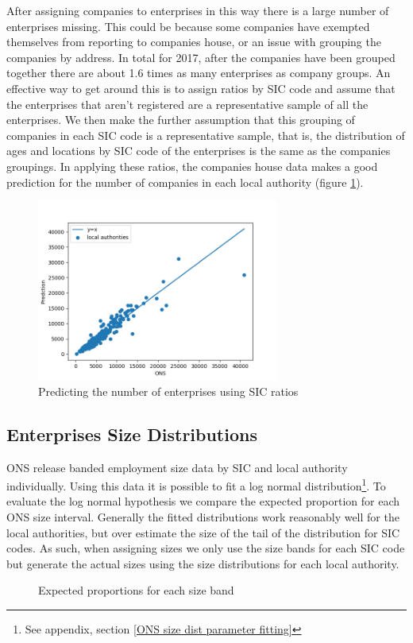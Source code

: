 \documentclass[a4paper,10pt]{article}
\begin{document}
After assigning companies to enterprises in this way there is a large number of enterprises missing. This could be because some companies have exempted themselves from reporting to companies house, or an issue with grouping the companies by address. In total for 2017, after the companies have been grouped together there are about 1.6 times as many enterprises as company groups. An effective way to get around this is to assign ratios by SIC code and assume that the enterprises that aren't registered are a representative sample of all the enterprises. We then make the further assumption that this grouping of companies in each SIC code is a representative sample, that is, the distribution of ages and locations by SIC code of the enterprises is the same as the companies groupings. In applying these ratios, the companies house data makes a good prediction for the number of companies in each local authority (figure \ref{predicting number of enterprises}).
\begin{figure}[!ht]
 \begin{center}
 \includegraphics[width=300px]{graphics/la_enterprise_predictions_with_ch}
 \end{center}
 \caption{Predicting the number of enterprises using SIC ratios}
 \label{predicting number of enterprises}
\end{figure}


\subsection{Enterprises Size Distributions}
\label{enterprise_sizes}
ONS release banded employment size data by SIC and local authority individually. Using this data it is possible to fit a log normal distribution\footnote{See appendix, section \ref{ONS size dist parameter fitting}}. To evaluate the log normal hypothesis we compare the expected proportion for each ONS size interval. Generally the fitted distributions work reasonably well for the local authorities, but over estimate the size of the tail of the distribution for SIC codes. As such, when assigning sizes we only use the size bands for each SIC code but generate the actual sizes using the size distributions for each local authority.
\begin{figure}[!ht]
 \caption{Expected proportions for each size band}
\end{figure}
\end{document}
